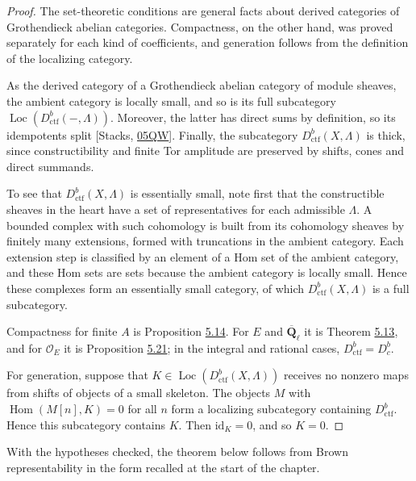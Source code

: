 \documentclass[11pt]{article}
\providecommand{\Dbc}{}\renewcommand{\Dbc}{D^b_c}
\providecommand{\Hom}{}\renewcommand{\Hom}{\operatorname{Hom}}
\providecommand{\Loc}{}\renewcommand{\Loc}{\operatorname{Loc}}
\begin{document}
\begin{proof}[{Proof}]\label{bp98}%
The set-theoretic conditions are general facts about derived categories of Grothendieck abelian categories. Compactness, on the other hand, was proved separately for each kind of coefficients, and generation follows from the definition of the localizing category.

As the derived category of a Grothendieck abelian category of module sheaves, the ambient category is locally small, and so is its full subcategory \(\Loc(D^b_{\mathrm{ctf}}(-,\Lambda))\). Moreover, the latter has direct sums by definition, so its idempotents split [Stacks, \href{https://stacks.math.columbia.edu/tag/05QW}{05QW}]. Finally, the subcategory \(D^b_{\mathrm{ctf}}(X,\Lambda)\) is thick, since constructibility and finite Tor amplitude are preserved by shifts, cones and direct summands.

To see that \(D^b_{\mathrm{ctf}}(X,\Lambda)\) is essentially small, note first that the constructible sheaves in the heart have a set of representatives for each admissible \(\Lambda\). A bounded complex with such cohomology is built from its cohomology sheaves by finitely many extensions, formed with truncations in the ambient category. Each extension step is classified by an element of a Hom set of the ambient category, and these Hom sets are sets because the ambient category is locally small. Hence these complexes form an essentially small category, of which \(D^b_{\mathrm{ctf}}(X,\Lambda)\) is a full subcategory.

Compactness for finite \(A\) is Proposition \hyperref[bp45]{5.14}. For \(E\) and \(\overline{\mathbf Q}_\ell\) it is Theorem \hyperref[bp40]{5.13}, and for \(\mathcal O_E\) it is Proposition \hyperref[bp71]{5.21}; in the integral and rational cases, \(D^b_{\mathrm{ctf}}=\Dbc\).

For generation, suppose that \(K\in\Loc(D^b_{\mathrm{ctf}}(X,\Lambda))\) receives no nonzero maps from shifts of objects of a small skeleton. The objects \(M\) with \(\Hom(M[n],K)=0\) for all \(n\) form a localizing subcategory containing \(D^b_{\mathrm{ctf}}\). Hence this subcategory contains \(K\). Then \(\mathrm{id}_K=0\), and so \(K=0\).
\end{proof}

\label{bp99}%
With the hypotheses checked, the theorem below follows from Brown representability in the form recalled at the start of the chapter.
\end{document}
